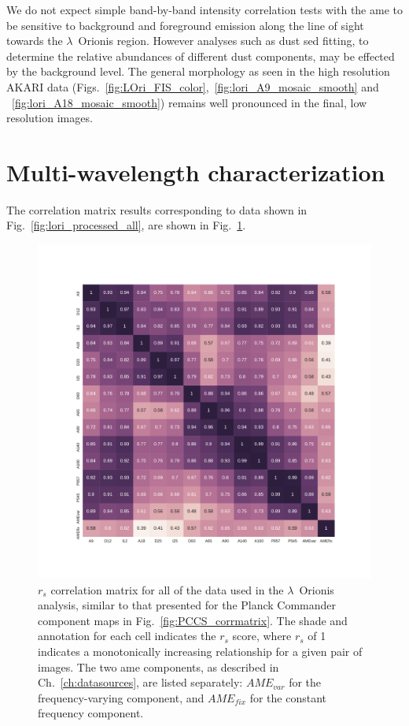           We do not expect simple band-by-band intensity correlation tests with the \acrshort{ame} to be sensitive to background and foreground emission along the line of sight towards the $\lambda$~Orionis region. However analyses such as dust \acrshort{sed} fitting, to determine the relative abundances of different dust components, may be effected by the background level. The general morphology as seen in the high resolution AKARI data (Figs.~\ref{fig:LOri_FIS_color},~\ref{fig:lori_A9_mosaic_smooth} and ~\ref{fig:lori_A18_mosaic_smooth}) remains well pronounced in the final, low resolution images.

	\section{Multi-wavelength characterization}
    The correlation matrix results corresponding to data shown in Fig.~\ref{fig:lori_processed_all}, are shown in Fig.~\ref{fig:orionis-corr-matrix}.
      \begin{figure}
        \includegraphics[width=\textwidth]{../Plots/ch_lori/Lori_corrmatrix_I.pdf}
        \centering
        \caption{$r_{s}$ correlation matrix for all of the data used in the $\lambda$~Orionis analysis, similar to that presented for the Planck Commander component maps in Fig.~\ref{fig:PCCS_corrmatrix}. The shade and annotation for each cell indicates the $r_{s}$ score, where $r_{s}$ of 1 indicates a monotonically increasing relationship for a given pair of images. The two \acrshort{ame} components, as described in Ch.~\ref{ch:datasources}, are listed separately: $AME_{var}$ for the frequency-varying component, and $AME_{fix}$ for the constant frequency component.}
        \label{fig:orionis-corr-matrix}
      \end{figure}
